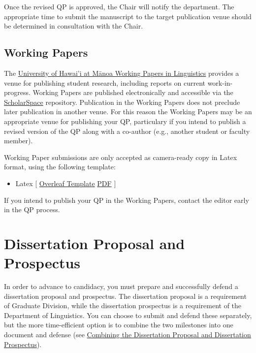 \documentclass[
]{book}
\providecommand{\tightlist}{%
  \setlength{\itemsep}{0pt}\setlength{\parskip}{0pt}}
\begin{document}
Once the revised QP is approved, the Chair will notify the department. The appropriate time to submit the manuscript to the target publication venue should be determined in consultation with the Chair.

\section{Working Papers}\label{wp}

The \href{https://hdl.handle.net/10125/42386}{University of Hawai'i at Mānoa Working Papers in Linguistics} provides a venue for publishing student research, including reports on current work-in-progress. Working Papers are published electronically and accessible via the \href{https://hdl.handle.net/10125/42386}{ScholarSpace} repository. Publication in the Working Papers does not preclude later publication in another venue. For this reason the Working Papers may be an appropriate venue for publishing your QP, particulary if you intend to publish a revised version of the QP along with a co-author (e.g., another student or faculty member).

Working Paper submissions are only accepted as camera-ready copy in Latex format, using the following template:

\begin{itemize}
\tightlist
\item
  Latex {[} \href{https://www.overleaf.com/read/vrzdjgmsxpxz}{Overleaf Template} \textbar{} \href{/files/UHMWPL_latex.pdf}{PDF} {]}
\end{itemize}

If you intend to publish your QP in the Working Papers, contact the editor early in the QP process.

\chapter{Dissertation Proposal and Prospectus}\label{prospectus}

In order to advance to candidacy, you must prepare and successfully defend a dissertation proposal and prospectus.
The dissertation proposal is a requirement of Graduate Division, while the dissertation prospectus is a requirement of the Department of Linguistics. You can choose to submit and defend these separately, but the more time-efficient option is to combine the two milestones into one document and defense (see \hyperref[combining-the-dissertation-proposal-and-dissertation-prospectus]{Combining the Dissertation Proposal and Dissertation Prospectus}).
\end{document}
